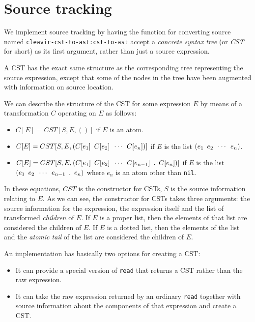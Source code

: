 \chapter{Source tracking}

We implement source tracking by having the function for converting
source named \texttt{cleavir-cst-to-ast:cst-to-ast} accept a
\emph{concrete syntax tree} (or \emph{CST} for short) as its first
argument, rather than just a source expression.

A CST has the exact same structure as the corresponding tree
representing the source expression, except that some of the nodes in
the tree have been augmented with information on source location.

We can describe the structure of the CST for some expression $E$ by
means of a transformation $C$ operating on $E$ as follows:

\begin{itemize}
\item $C[E] = CST[S, E, ()]$ if $E$ is an atom.
\item $C[E] = CST[S, E,
  (C[e_1]\enskip{}C[e_2]\enskip{}\cdots\enskip{}C[e_n])]$ if $E$ is
  the list $(e_1\enskip{}e_2\enskip{}\cdots\enskip{}e_n)$.
\item $C[E] = CST[S, E,
  (C[e_1]\enskip{}C[e_2]\enskip{}\cdots\enskip{}C[e_{n-1}]\enskip{}.\enskip{}C[e_n])]$
  if $E$ is the list
  $(e_1\enskip{}e_2\enskip{}\cdots\enskip{}e_{n-1}\enskip{}.\enskip{}e_n)$
  where $e_n$ is an atom other than \texttt{nil}.
\end{itemize}

In these equations, $CST$ is the constructor for CSTs, $S$ is the
source information relating to $E$.  As we can see, the constructor
for CSTs takes three arguments: the source information for the
expression, the expression itself and the list of transformed
\emph{children} of $E$.  If $E$ is a proper list, then the elements of
that list are considered the children of $E$.  If $E$ is a dotted
list, then the elements of the list and the \emph{atomic tail} of the
list are considered the children of $E$.

An implementation has basically two options for creating a CST:

\begin{itemize}
\item It can provide a special version of \texttt{read} that returns a
  CST rather than the raw expression.
\item It can take the raw expression returned by an ordinary
  \texttt{read} together with source information about the components
  of that expression and create a CST. 
\end{itemize}

